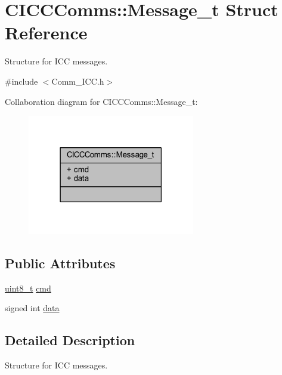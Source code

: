 \hypertarget{struct_c_i_c_c_comms_1_1_message__t}{}\section{C\+I\+C\+C\+Comms\+:\+:Message\+\_\+t Struct Reference}
\label{struct_c_i_c_c_comms_1_1_message__t}


Structure for I\+CC messages.  




{\ttfamily \#include $<$Comm\+\_\+\+I\+C\+C.\+h$>$}



Collaboration diagram for C\+I\+C\+C\+Comms\+:\+:Message\+\_\+t\+:
\nopagebreak
\begin{figure}[H]
\begin{center}
\leavevmode
\includegraphics[width=207pt]{struct_c_i_c_c_comms_1_1_message__t__coll__graph}
\end{center}
\end{figure}
\subsection*{Public Attributes}
\begin{DoxyCompactItemize}
\item 
\mbox{\hyperlink{_a_d_a_s___types_8h_aba7bc1797add20fe3efdf37ced1182c5}{uint8\+\_\+t}} \mbox{\hyperlink{struct_c_i_c_c_comms_1_1_message__t_adf3e3290f54ee3997bc837463a340d05}{cmd}}
\item 
signed int \mbox{\hyperlink{struct_c_i_c_c_comms_1_1_message__t_a25cfce11e78d103524b695b281629d75}{data}}
\end{DoxyCompactItemize}


\subsection{Detailed Description}
Structure for I\+CC messages. 

